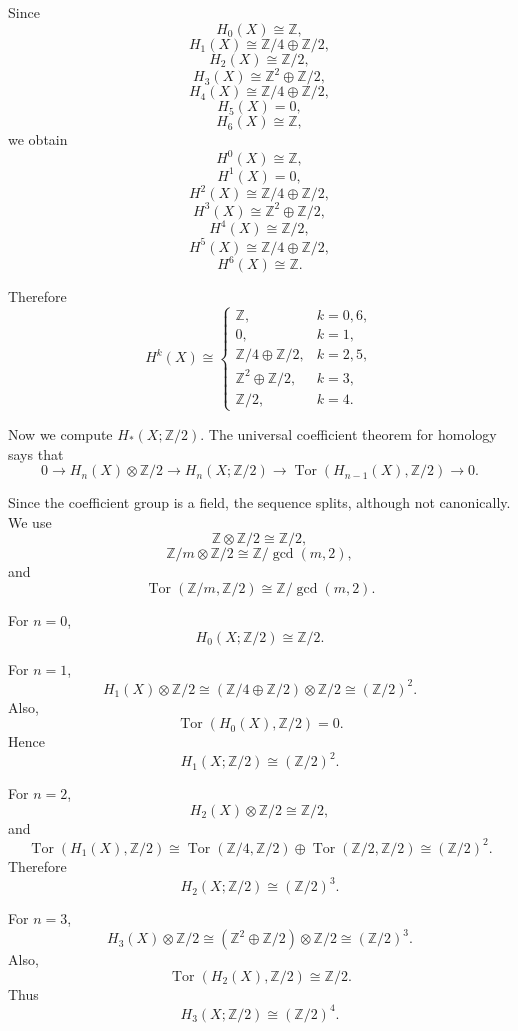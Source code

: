 \documentclass[12pt,a4paper]{article}
\theoremstyle{notespace}
\begin{document}
Since
\[
H_0(X)\cong \mathbb Z,
\]
\[
H_1(X)\cong \mathbb Z/4\oplus \mathbb Z/2,
\]
\[
H_2(X)\cong \mathbb Z/2,
\]
\[
H_3(X)\cong \mathbb Z^2\oplus \mathbb Z/2,
\]
\[
H_4(X)\cong \mathbb Z/4\oplus \mathbb Z/2,
\]
\[
H_5(X)=0,
\]
\[
H_6(X)\cong \mathbb Z,
\]
we obtain
\[
H^0(X)\cong \mathbb Z,
\]
\[
H^1(X)=0,
\]
\[
H^2(X)\cong \mathbb Z/4\oplus \mathbb Z/2,
\]
\[
H^3(X)\cong \mathbb Z^2\oplus \mathbb Z/2,
\]
\[
H^4(X)\cong \mathbb Z/2,
\]
\[
H^5(X)\cong \mathbb Z/4\oplus \mathbb Z/2,
\]
\[
H^6(X)\cong \mathbb Z.
\]

Therefore
\[
\boxed{
	H^k(X)\cong
	\begin{cases}
		\mathbb Z, & k=0,6,\\[1mm]
		0, & k=1,\\[1mm]
		\mathbb Z/4\oplus \mathbb Z/2, & k=2,5,\\[1mm]
		\mathbb Z^2\oplus \mathbb Z/2, & k=3,\\[1mm]
		\mathbb Z/2, & k=4.
\end{cases}}
\]

Now we compute \(H_*(X;\mathbb Z/2)\). The universal coefficient theorem for homology says that
\[
0
\longrightarrow
H_n(X)\otimes \mathbb Z/2
\longrightarrow
H_n(X;\mathbb Z/2)
\longrightarrow
\operatorname{Tor}(H_{n-1}(X),\mathbb Z/2)
\longrightarrow
0.
\]

Since the coefficient group is a field, the sequence splits, although not canonically. We use
\[
\mathbb Z\otimes \mathbb Z/2\cong \mathbb Z/2,
\]
\[
\mathbb Z/m\otimes \mathbb Z/2
\cong
\mathbb Z/\gcd(m,2),
\]
and
\[
\operatorname{Tor}(\mathbb Z/m,\mathbb Z/2)
\cong
\mathbb Z/\gcd(m,2).
\]

For \(n=0\),
\[
H_0(X;\mathbb Z/2)\cong \mathbb Z/2.
\]

For \(n=1\),
\[
H_1(X)\otimes \mathbb Z/2
\cong
(\mathbb Z/4\oplus \mathbb Z/2)\otimes \mathbb Z/2
\cong
(\mathbb Z/2)^2.
\]
Also,
\[
\operatorname{Tor}(H_0(X),\mathbb Z/2)=0.
\]
Hence
\[
H_1(X;\mathbb Z/2)\cong (\mathbb Z/2)^2.
\]

For \(n=2\),
\[
H_2(X)\otimes \mathbb Z/2
\cong
\mathbb Z/2,
\]
and
\[
\operatorname{Tor}(H_1(X),\mathbb Z/2)
\cong
\operatorname{Tor}(\mathbb Z/4,\mathbb Z/2)
\oplus
\operatorname{Tor}(\mathbb Z/2,\mathbb Z/2)
\cong
(\mathbb Z/2)^2.
\]
Therefore
\[
H_2(X;\mathbb Z/2)\cong (\mathbb Z/2)^3.
\]

For \(n=3\),
\[
H_3(X)\otimes \mathbb Z/2
\cong
(\mathbb Z^2\oplus \mathbb Z/2)\otimes \mathbb Z/2
\cong
(\mathbb Z/2)^3.
\]
Also,
\[
\operatorname{Tor}(H_2(X),\mathbb Z/2)
\cong
\mathbb Z/2.
\]
Thus
\[
H_3(X;\mathbb Z/2)\cong (\mathbb Z/2)^4.
\]
\end{document}
